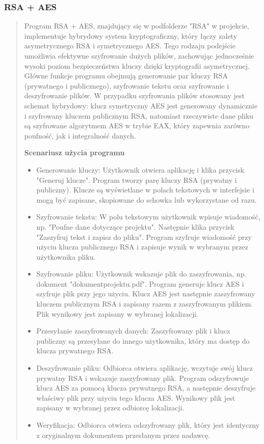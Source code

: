 \documentclass[12pt,a4paper]{article}
\begin{document}
\subsubsection{RSA + AES}
\begin{quotation} \noindent Program RSA + AES, znajdujący się w podfolderze "RSA" w projekcie, implementuje hybrydowy system kryptograficzny, który łączy zalety asymetrycznego RSA i symetrycznego AES. Tego rodzaju podejście umożliwia efektywne szyfrowanie dużych plików, zachowując jednocześnie wysoki poziom bezpieczeństwa kluczy dzięki kryptografii asymetrycznej. Główne funkcje programu obejmują generowanie par kluczy RSA (prywatnego i publicznego), szyfrowanie tekstu oraz szyfrowanie i deszyfrowanie plików. W przypadku szyfrowania plików stosowany jest schemat hybrydowy: klucz symetryczny AES jest generowany dynamicznie i szyfrowany kluczem publicznym RSA, natomiast rzeczywiste dane pliku są szyfrowane algorytmem AES w trybie EAX, który zapewnia zarówno poufność, jak i integralność danych.\newline

\noindent\textbf{Scenariusz użycia programu}
\begin{itemize}
\item Generowanie kluczy: Użytkownik otwiera aplikację i klika przycisk "Generuj klucze". Program tworzy parę kluczy RSA (prywatny i publiczny). Klucze są wyświetlane w polach tekstowych w interfejsie i mogą być zapisane, skopiowane do schowka lub wykorzystane od razu.
\item Szyfrowanie tekstu: W polu tekstowym użytkownik wpisuje wiadomość, np. "Poufne dane dotyczące projektu". Następnie klika przycisk "Zaszyfruj tekst i zapisz do pliku". Program szyfruje wiadomość przy użyciu klucza publicznego RSA i zapisuje wynik w wybranym przez użytkownika pliku.
\item Szyfrowanie pliku: Użytkownik wskazuje plik do zaszyfrowania, np. dokument "dokumentprojektu.pdf". Program generuje klucz AES i szyfruje plik przy jego użyciu. Klucz AES jest następnie zaszyfrowany kluczem publicznym RSA i zapisany razem z zaszyfrowanym plikiem. Plik wynikowy jest zapisany w wybranej lokalizacji.
\item Przesyłanie zaszyfrowanych danych: Zaszyfrowany plik i klucz publiczny są przesyłane do innego użytkownika, który ma dostęp do klucza prywatnego RSA.
\item Deszyfrowanie pliku: Odbiorca otwiera aplikację, wczytuje swój klucz prywatny RSA i wskazuje zaszyfrowany plik. Program odszyfrowuje klucz AES za pomocą klucza prywatnego RSA, a następnie deszyfruje właściwy plik przy użyciu tego klucza AES. Wynikowy plik jest zapisany w wybranej przez odbiorcę lokalizacji.
\item Weryfikacja: Odbiorca otwiera odszyfrowany plik, który jest identyczny z oryginalnym dokumentem przesłanym przez nadawcę.
\end{itemize}
\end{quotation}
\end{document}
